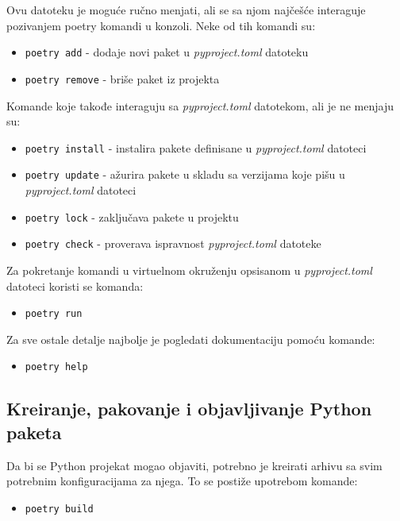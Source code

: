 \documentclass[12pt]{report}
\begin{document}
Ovu datoteku je moguće ručno menjati, ali se sa njom najčešće interaguje pozivanjem poetry komandi u konzoli. Neke od tih komandi su:

\begin{itemize}
    \item \texttt{poetry add} - dodaje novi paket u \textit{pyproject.toml} datoteku
    \item \texttt{poetry remove} - briše paket iz projekta
\end{itemize}

Komande koje takođe interaguju sa \textit{pyproject.toml} datotekom, ali je ne menjaju su:

\begin{itemize}
    \item \texttt{poetry install} - instalira pakete definisane u \textit{pyproject.toml} datoteci
    \item \texttt{poetry update} - ažurira pakete u skladu sa verzijama koje pišu u \textit{pyproject.toml} datoteci
    \item \texttt{poetry lock} - zaključava pakete u projektu
    \item \texttt{poetry check} - proverava ispravnost \textit{pyproject.toml} datoteke
\end{itemize}

Za pokretanje komandi u virtuelnom okruženju opsisanom u \textit{pyproject.toml} datoteci koristi se komanda:

\begin{itemize}
    \item \texttt{poetry run}
\end{itemize}

Za sve ostale detalje najbolje je pogledati dokumentaciju pomoću komande:

\begin{itemize}
    \item \texttt{poetry help}
\end{itemize}

\subsection{Kreiranje, pakovanje i objavljivanje Python paketa}
Da bi se Python projekat mogao objaviti, potrebno je kreirati arhivu sa svim potrebnim konfiguracijama za njega. To se postiže upotrebom komande:

\begin{itemize}
    \item \texttt{poetry build}
\end{itemize}
\end{document}
